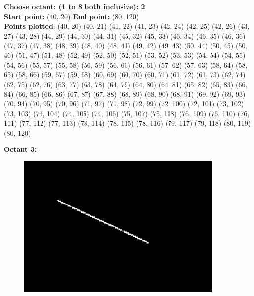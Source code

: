 \documentclass[12pt,letterpaper]{article}
\begin{document}
\textbf{Choose octant: (1 to 8 both inclusive): 2}\\
\textbf{Start point:} (40, 20)
\textbf{End point:} (80, 120)\\
\textbf{Points plotted}: 
(40, 20) (40, 21) (41, 22) (41, 23) 
(42, 24) (42, 25) (42, 26) (43, 27) 
(43, 28) (44, 29) (44, 30) (44, 31) 
(45, 32) (45, 33) (46, 34) (46, 35) 
(46, 36) (47, 37) (47, 38) (48, 39) 
(48, 40) (48, 41) (49, 42) (49, 43) 
(50, 44) (50, 45) (50, 46) (51, 47) 
(51, 48) (52, 49) (52, 50) (52, 51) 
(53, 52) (53, 53) (54, 54) (54, 55) 
(54, 56) (55, 57) (55, 58) (56, 59) 
(56, 60) (56, 61) (57, 62) (57, 63) 
(58, 64) (58, 65) (58, 66) (59, 67) 
(59, 68) (60, 69) (60, 70) (60, 71) 
(61, 72) (61, 73) (62, 74) (62, 75) 
(62, 76) (63, 77) (63, 78) (64, 79) 
(64, 80) (64, 81) (65, 82) (65, 83) 
(66, 84) (66, 85) (66, 86) (67, 87) 
(67, 88) (68, 89) (68, 90) (68, 91) 
(69, 92) (69, 93) (70, 94) (70, 95) 
(70, 96) (71, 97) (71, 98) (72, 99) 
(72, 100) (72, 101) (73, 102) (73, 103) 
(74, 104) (74, 105) (74, 106) (75, 107) 
(75, 108) (76, 109) (76, 110) (76, 111) 
(77, 112) (77, 113) (78, 114) (78, 115) 
(78, 116) (79, 117) (79, 118) (80, 119) 
(80, 120) 

\newpage
\textbf{Octant 3:}
\begin{figure}[h]
    \centering
    \includegraphics[height=7cm]{Outputs/O3.png}
\end{figure}
\end{document}
